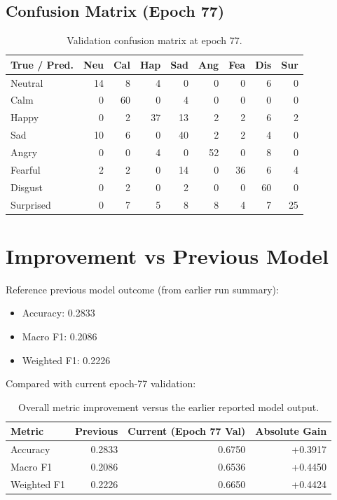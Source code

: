 \documentclass[11pt]{article}
\begin{document}
\subsection{Confusion Matrix (Epoch 77)}
\begin{table}[H]
\centering
\small
\begin{tabular}{lrrrrrrrr}
\toprule
True / Pred. & Neu & Cal & Hap & Sad & Ang & Fea & Dis & Sur \\
\midrule
Neutral   & 14 & 8 & 4 & 0 & 0 & 0 & 6 & 0 \\
Calm      & 0 & 60 & 0 & 4 & 0 & 0 & 0 & 0 \\
Happy     & 0 & 2 & 37 & 13 & 2 & 2 & 6 & 2 \\
Sad       & 10 & 6 & 0 & 40 & 2 & 2 & 4 & 0 \\
Angry     & 0 & 0 & 4 & 0 & 52 & 0 & 8 & 0 \\
Fearful   & 2 & 2 & 0 & 14 & 0 & 36 & 6 & 4 \\
Disgust   & 0 & 2 & 0 & 2 & 0 & 0 & 60 & 0 \\
Surprised & 0 & 7 & 5 & 8 & 8 & 4 & 7 & 25 \\
\bottomrule
\end{tabular}
\caption{Validation confusion matrix at epoch 77.}
\end{table}

\section{Improvement vs Previous Model}
Reference previous model outcome (from earlier run summary):
\begin{itemize}
  \item Accuracy: 0.2833
  \item Macro F1: 0.2086
  \item Weighted F1: 0.2226
\end{itemize}

Compared with current epoch-77 validation:
\begin{table}[H]
\centering
\begin{tabular}{lrrr}
\toprule
Metric & Previous & Current (Epoch 77 Val) & Absolute Gain \\
\midrule
Accuracy & 0.2833 & 0.6750 & +0.3917 \\
Macro F1 & 0.2086 & 0.6536 & +0.4450 \\
Weighted F1 & 0.2226 & 0.6650 & +0.4424 \\
\bottomrule
\end{tabular}
\caption{Overall metric improvement versus the earlier reported model output.}
\end{table}
\end{document}
